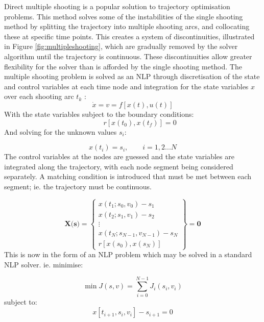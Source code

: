 Direct multiple shooting is a popular solution to trajectory optimisation problems. This method solves some of the instabilities of the single shooting method by splitting the trajectory into multiple shooting arcs, and collocating these at specific time points. This creates a system of discontinuities, illustrated in Figure \ref{fig:multipleshooting}, which are gradually removed by the solver algorithm until the trajectory is continuous. These discontinuities allow greater flexibility for the solver than is afforded by the single shooting method. The multiple shooting problem is solved as an NLP through discretisation of the state and control variables at each time node and integration for the state variables $x$ over each shooting arc $t_k$ \cite{Subchan2008}:
\begin{equation}
\dot{x} = v = f[x(t),u(t)]
\end{equation}
With the state variables subject to the boundary conditions:
\begin{equation}
\qquad r[x(t_0),x(t_f)] = 0
\end{equation}
And solving for the unknown values $s_i$:

\begin{equation}
x(t_i) = s_i, \qquad i = 1,2...N
\end{equation}
The control variables at the nodes are guessed and the state variables are integrated along the trajectory, with each node segment being considered separately. A matching condition is introduced that must be met between each segment; ie. the trajectory must be continuous. \cite{Michalik2009}

\begin{equation}
\textbf{X(s)} = \begin{Bmatrix}
x(t_1;s_0,v_0) - s_1 \\
x(t_2;s_1,v_1) - s_2  \\
\vdots    \\
x(t_N;s_{N-1},v_{N-1}) - s_N  \\
r[x(s_0),x(s_N)]
\end{Bmatrix} = \textbf{0}
\end{equation}
This is now in the form of an NLP problem which may be solved in a standard NLP solver. ie. minimise:

\begin{equation}
\min J(s,v) = \sum_{i=0}^{N-1}J_i(s_i,v_i)
\end{equation}
subject to:
\begin{equation}
x[t_{i+1},s_i,v_i] - s_{i+1} = 0
\end{equation}

